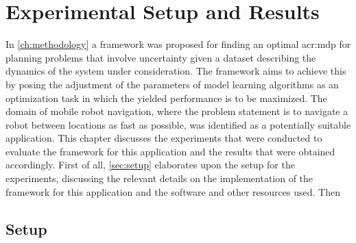 \chapter{Experimental Setup and Results}
\label{ch:experimental-results}


In \autoref{ch:methodology} a framework was proposed for finding an optimal \acrshort{acr:mdp} for planning problems that involve uncertainty given a dataset describing the dynamics of the system under consideration.
The framework aims to achieve this by posing the adjustment of the parameters of model learning algorithms as an optimization task in which the yielded performance is to be maximized.
The domain of mobile robot navigation, where the problem statement is to navigate a robot between locations as fast as possible, was identified as a potentially suitable application.
This chapter discusses the experiments that were conducted to evaluate the framework for this application and the results that were obtained accordingly.
First of all, \autoref{sec:setup} elaborates upon the setup for the experiments, discussing the relevant details on the implementation of the framework for this application and the software and other resources used.
Then

\section{Setup}
\label{sec:setup}


